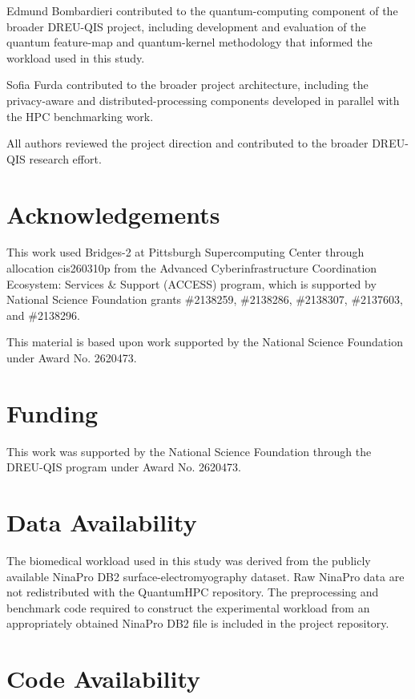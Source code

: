 \documentclass[pdflatex,sn-mathphys-num]{sn-jnl}%
\theoremstyle{thmstyleone}%
\theoremstyle{thmstyletwo}%
\theoremstyle{thmstylethree}%
\begin{document}
Edmund Bombardieri contributed to the quantum-computing component of the
broader DREU-QIS project, including development and evaluation of the quantum
feature-map and quantum-kernel methodology that informed the workload used in
this study.

Sofia Furda contributed to the broader project architecture, including the
privacy-aware and distributed-processing components developed in parallel with
the HPC benchmarking work.

All authors reviewed the project direction and contributed to the broader
DREU-QIS research effort.

\section*{Acknowledgements}


This work used Bridges-2 at Pittsburgh Supercomputing Center through allocation
cis260310p from the Advanced Cyberinfrastructure Coordination
Ecosystem: Services \& Support (ACCESS) program, which is supported by National
Science Foundation grants \#2138259, \#2138286, \#2138307, \#2137603, and
\#2138296.

This material is based upon work supported by the National Science Foundation
under Award No. 2620473.

\section*{Funding}

This work was supported by the National Science Foundation through the
DREU-QIS program under Award No. 2620473.

\section*{Data Availability}

The biomedical workload used in this study was derived from the publicly
available NinaPro DB2 surface-electromyography dataset. Raw NinaPro data are not
redistributed with the QuantumHPC repository. The preprocessing and benchmark
code required to construct the experimental workload from an appropriately
obtained NinaPro DB2 file is included in the project repository.

\section*{Code Availability}
\end{document}
